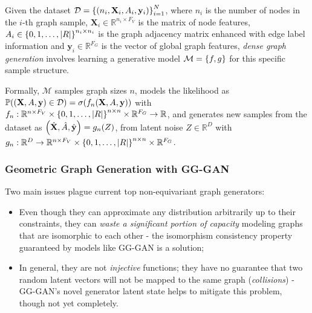 \begin{definition}
Given the dataset $\mathcal{D}=\mathopen{}\left\{\mathopen{}\left(n_i,\mathbf{X}_i,A_i,\mathbf{y}_i\right)\right\}_{i=1}^{N}$, where $n_i$ is the number of nodes in the $i$-th graph sample, $\mathbf{X}_i \in \mathbb{R}^{n_i \times F_V}$ is the matrix of node features, $A_i \in \mathopen{}\left\{0,1,\dots,\mathopen{}\left|R\right|\right\}^{n_i \times n_i}$ is the graph adjacency matrix enhanced with edge label information and $\mathbf{y}_i \in \mathbb{R}^{F_G}$ is the vector of global graph features, \emph{dense graph generation} involves learning a generative model $\mathcal{M}=\mathopen{}\left\{f,g\right\}$ for this specific sample structure. 

Formally, $\mathcal{M}$ samples graph sizes $n$, models the likelihood as $\mathbb{P}\mathopen{}\left(\mathopen{}\left(\mathbf{X},A,\mathbf{y}\right) \in \mathcal{D}\right)=\sigma\mathopen{}\left(f_n\mathopen{}\left(\mathbf{X},A,\mathbf{y}\right)\right)$ with $f_n: \mathbb{R}^{n \times F_V} \times \mathopen{}\left\{0,1,\dots,\mathopen{}\left|R\right|\right\}^{n \times n} \times \mathbb{R}^{F_G} \to \mathbb{R}$, and generates new samples from the dataset as $\mathopen{}\left(\hat{\mathbf{X}},\hat{A},\hat{\mathbf{y}}\right)=g_n\mathopen{}\left(Z\right)$, from latent noise $Z\in\mathbb{R}^D$ with $g_n:\mathbb{R}^D \to \mathbb{R}^{n \times F_V} \times \mathopen{}\left\{0,1,\dots,\mathopen{}\left|R\right|\right\}^{n \times n} \times \mathbb{R}^{F_G}$.
\end{definition}

\subsubsection{Geometric Graph Generation with GG-GAN}
Two main issues plague current top non-equivariant graph generators: 
\begin{itemize}
\item Even though they can approximate any distribution arbitrarily up to their constraints, they can \emph{waste a significant portion of capacity} modeling graphs that are isomorphic to each other - the isomorphism consistency property guaranteed by models like GG-GAN is a solution;
\item In general, they are not \emph{injective} functions; they have no guarantee that two random latent vectors will not be mapped to the same graph (\emph{collisions}) - GG-GAN's novel generator latent state helps to mitigate this problem, though not yet completely.  
\end{itemize}

